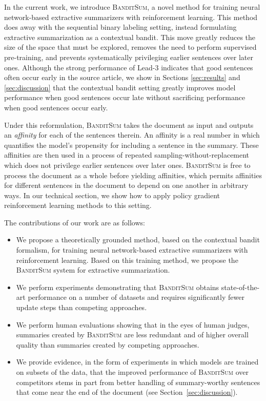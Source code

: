 \documentclass[11pt,a4paper]{article}
\newcommand{\B}{\textsc{BanditSum }}
\begin{document}
In the current work, we introduce \textsc{BanditSum}, a novel method for training neural network-based extractive summarizers with reinforcement learning. This method does away with the sequential binary labeling setting, instead formulating extractive summarization as a contextual bandit. This move greatly reduces the size of the space that must be explored, removes the need to perform supervised pre-training, and prevents systematically privileging earlier sentences over later ones. Although the strong performance of Lead-3 indicates that good sentences often occur early in the source article, we show in Sections \ref{sec:results} and \ref{sec:discussion} that the contextual bandit setting greatly improves model performance when good sentences occur late without sacrificing performance when good sentences occur early.

Under this reformulation, \B takes the document as input and outputs an \textit{affinity} for each of the sentences therein. An affinity is a real number in  which quantifies the model's propensity for including a sentence in the summary. These affinities are then used in a process of repeated sampling-without-replacement which does not privilege earlier sentences over later ones. \B is free to process the document as a whole before yielding affinities, which permits affinities for different sentences in the document to depend on one another in arbitrary ways. In our technical section, we show how to apply policy gradient reinforcement learning methods to this setting. 

The contributions of our work are as follows:
\begin{itemize}
\item We propose a theoretically grounded method, based on the contextual bandit formalism, for training neural network-based extractive summarizers with reinforcement learning. Based on this training method, we propose the \B system for extractive summarization.

\item We perform experiments demonstrating that \B obtains state-of-the-art performance on a number of datasets and requires significantly fewer update steps than competing approaches.

\item We perform human evaluations showing that in the eyes of human judges, summaries created by \B are less redundant and of higher overall quality than summaries created by competing approaches.

\item We provide evidence, in the form of experiments in which models are trained on subsets of the data, that the improved performance of \B over competitors stems in part from better handling of summary-worthy sentences that come near the end of the document (see Section~\ref{sec:discussion}).
\end{itemize}
\end{document}
